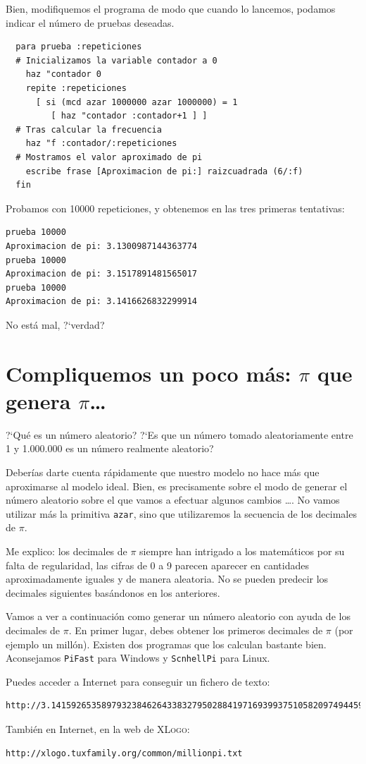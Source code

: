 \documentclass[12pt,twoside,spanish,a4paper]{report}
\begin{document}
Bien, modifiquemos el programa de modo que cuando lo lancemos, podamos
indicar el n\'umero de pruebas deseadas.
\begin{verbatim}
  para prueba :repeticiones
  # Inicializamos la variable contador a 0
    haz "contador 0
    repite :repeticiones
      [ si (mcd azar 1000000 azar 1000000) = 1
         [ haz "contador :contador+1 ] ]
  # Tras calcular la frecuencia
    haz "f :contador/:repeticiones
  # Mostramos el valor aproximado de pi
    escribe frase [Aproximacion de pi:] raizcuadrada (6/:f)
  fin \end{verbatim}
Probamos con 10000 repeticiones, y obtenemos en las tres primeras
tentativas:
\begin{verbatim}
prueba 10000
Aproximacion de pi: 3.1300987144363774
prueba 10000
Aproximacion de pi: 3.1517891481565017
prueba 10000
Aproximacion de pi: 3.1416626832299914 \end{verbatim}
\noindent No est\'a mal, ?`verdad?

\section{Compliquemos un poco m\'as: $\pi$ que genera $\pi$\ldots}
   \label{sub:Compliquemos-pi}

?`Qu\'e es un n\'umero aleatorio? ?`Es que un n\'umero tomado aleatoriamente
entre 1 y 1.000.000 es un n\'umero realmente aleatorio?

Deber\'ias darte cuenta r\'apidamente que nuestro modelo no hace m\'as que
aproximarse al modelo ideal. Bien, es precisamente sobre el modo de
generar el n\'umero aleatorio sobre el que vamos a efectuar algunos
cambios \ldots{}. No vamos utilizar m\'as la primitiva \texttt{azar},
sino que utilizaremos la secuencia de los decimales de $\pi$.

Me explico: los decimales de $\pi$ siempre han intrigado a los matem\'aticos
por su falta de regularidad, las cifras de 0 a 9 parecen aparecer
en cantidades aproximadamente iguales y de manera aleatoria. No se
pueden predecir los decimales siguientes bas\'andonos en los anteriores.

Vamos a ver a continuaci\'on como generar un n\'umero aleatorio con ayuda
de los decimales de $\pi$. En primer lugar, debes obtener los primeros
decimales de $\pi$ (por ejemplo un mill\'on). Existen dos programas
que los calculan bastante bien. Aconsejamos \texttt{PiFast} para Windows
y \texttt{ScnhellPi} para Linux.

Puedes acceder a Internet para conseguir un fichero de texto:
\begin{verbatim}
http://3.141592653589793238462643383279502884197169399375105820974944592.com \end{verbatim}
Tambi\'en en Internet, en la web de \textsc{XLogo}:
\begin{verbatim}
http://xlogo.tuxfamily.org/common/millionpi.txt \end{verbatim}
\end{document}
